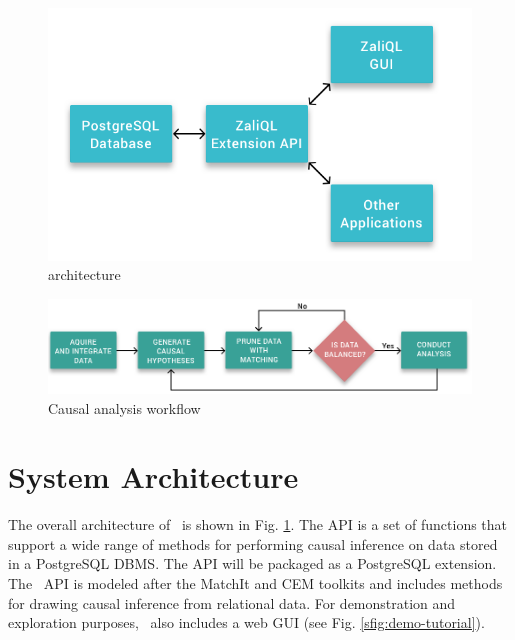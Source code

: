 
\begin{figure}\center
 \includegraphics[scale=0.2]{Figures/System-Overview.png}
  \vspace{-3.3mm} \caption{\GSQLB architecture}

  \label{fig:arch}
  \vspace{-3mm}
\end{figure}


\begin{figure} \center
  \includegraphics[scale=0.2]{Figures/Matching-Flowchart.png}
  \vspace{-3mm}\caption{Causal analysis workflow}

\label{fig:flowchart}
\vspace{-0.3cm}
\end{figure}

\vspace{-.2cm}

\section{System Architecture}

The overall architecture of \GSQL\ is shown in Fig. \ref{fig:arch}.
The API is a set of functions that support a wide
range of methods for performing causal inference on data stored in a PostgreSQL DBMS. %
The API will be packaged as a PostgreSQL extension. %
The \GSQL\ API is modeled after the MatchIt and CEM toolkits 
\cite{ho2005,iacus2009cem} and includes methods for drawing causal inference from relational data. For demonstration and exploration purposes, \GSQL\ also includes a web GUI
(see Fig. \ref{sfig:demo-tutorial}). %

